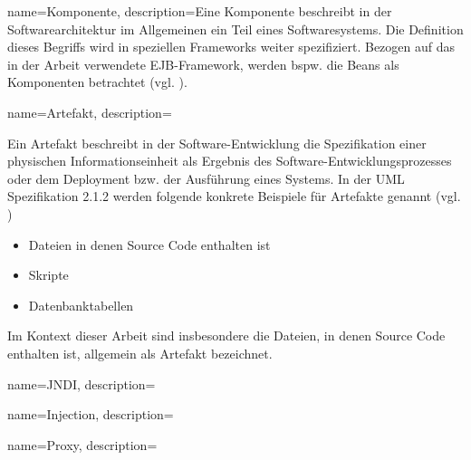 

{
    name=Komponente,
    description={Eine Komponente beschreibt in der Softwarearchitektur im Allgemeinen ein Teil eines Softwaresystems. Die Definition dieses Begriffs wird in speziellen Frameworks weiter spezifiziert. Bezogen auf das in der Arbeit verwendete EJB-Framework, werden bspw. die Beans als Komponenten betrachtet (vgl. \cite{ejbspec}).
}
}
{
    name=Artefakt,
    description={Ein Artefakt beschreibt in der Software-Entwicklung die Spezifikation einer physischen Informationseinheit als Ergebnis des Software-Entwicklungsprozesses oder dem Deployment bzw. der Ausführung eines Systems. In der UML Spezifikation 2.1.2 werden folgende konkrete Beispiele für Artefakte genannt (vgl. \cite{uml})
    \begin{itemize}
    \item Dateien in denen Source Code enthalten ist
    \item Skripte
    \item Datenbanktabellen    
    \end{itemize}
    \noindent
    Im Kontext dieser Arbeit sind insbesondere die Dateien, in denen Source Code enthalten ist, allgemein als Artefakt bezeichnet.
}
}

{
    name=JNDI,
    description={}
}


{
    name=Injection,
    description={}
}


{
    name=Proxy,
    description={}
}